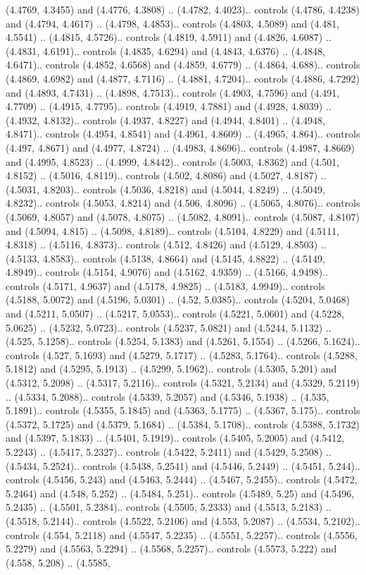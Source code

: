 (4.4769, 4.3455) and (4.4776, 4.3808) .. (4.4782, 4.4023).. controls (4.4786, 4.4238) and (4.4794, 4.4617) .. (4.4798, 4.4853).. controls (4.4803, 4.5089) and (4.481, 4.5541) .. (4.4815, 4.5726).. controls (4.4819, 4.5911) and (4.4826, 4.6087) .. (4.4831, 4.6191).. controls (4.4835, 4.6294) and (4.4843, 4.6376) .. (4.4848, 4.6471).. controls (4.4852, 4.6568) and (4.4859, 4.6779) .. (4.4864, 4.688).. controls (4.4869, 4.6982) and (4.4877, 4.7116) .. (4.4881, 4.7204).. controls (4.4886, 4.7292) and (4.4893, 4.7431) .. (4.4898, 4.7513).. controls (4.4903, 4.7596) and (4.491, 4.7709) .. (4.4915, 4.7795).. controls (4.4919, 4.7881) and (4.4928, 4.8039) .. (4.4932, 4.8132).. controls (4.4937, 4.8227) and (4.4944, 4.8401) .. (4.4948, 4.8471).. controls (4.4954, 4.8541) and (4.4961, 4.8609) .. (4.4965, 4.864).. controls (4.497, 4.8671) and (4.4977, 4.8724) .. (4.4983, 4.8696).. controls (4.4987, 4.8669) and (4.4995, 4.8523) .. (4.4999, 4.8442).. controls (4.5003, 4.8362) and (4.501, 4.8152) .. (4.5016, 4.8119).. controls (4.502, 4.8086) and (4.5027, 4.8187) .. (4.5031, 4.8203).. controls (4.5036, 4.8218) and (4.5044, 4.8249) .. (4.5049, 4.8232).. controls (4.5053, 4.8214) and (4.506, 4.8096) .. (4.5065, 4.8076).. controls (4.5069, 4.8057) and (4.5078, 4.8075) .. (4.5082, 4.8091).. controls (4.5087, 4.8107) and (4.5094, 4.815) .. (4.5098, 4.8189).. controls (4.5104, 4.8229) and (4.5111, 4.8318) .. (4.5116, 4.8373).. controls (4.512, 4.8426) and (4.5129, 4.8503) .. (4.5133, 4.8583).. controls (4.5138, 4.8664) and (4.5145, 4.8822) .. (4.5149, 4.8949).. controls (4.5154, 4.9076) and (4.5162, 4.9359) .. (4.5166, 4.9498).. controls (4.5171, 4.9637) and (4.5178, 4.9825) .. (4.5183, 4.9949).. controls (4.5188, 5.0072) and (4.5196, 5.0301) .. (4.52, 5.0385).. controls (4.5204, 5.0468) and (4.5211, 5.0507) .. (4.5217, 5.0553).. controls (4.5221, 5.0601) and (4.5228, 5.0625) .. (4.5232, 5.0723).. controls (4.5237, 5.0821) and (4.5244, 5.1132) .. (4.525, 5.1258).. controls (4.5254, 5.1383) and (4.5261, 5.1554) .. (4.5266, 5.1624).. controls (4.527, 5.1693) and (4.5279, 5.1717) .. (4.5283, 5.1764).. controls (4.5288, 5.1812) and (4.5295, 5.1913) .. (4.5299, 5.1962).. controls (4.5305, 5.201) and (4.5312, 5.2098) .. (4.5317, 5.2116).. controls (4.5321, 5.2134) and (4.5329, 5.2119) .. (4.5334, 5.2088).. controls (4.5339, 5.2057) and (4.5346, 5.1938) .. (4.535, 5.1891).. controls (4.5355, 5.1845) and (4.5363, 5.1775) .. (4.5367, 5.175).. controls (4.5372, 5.1725) and (4.5379, 5.1684) .. (4.5384, 5.1708).. controls (4.5388, 5.1732) and (4.5397, 5.1833) .. (4.5401, 5.1919).. controls (4.5405, 5.2005) and (4.5412, 5.2243) .. (4.5417, 5.2327).. controls (4.5422, 5.2411) and (4.5429, 5.2508) .. (4.5434, 5.2524).. controls (4.5438, 5.2541) and (4.5446, 5.2449) .. (4.5451, 5.244).. controls (4.5456, 5.243) and (4.5463, 5.2444) .. (4.5467, 5.2455).. controls (4.5472, 5.2464) and (4.548, 5.252) .. (4.5484, 5.251).. controls (4.5489, 5.25) and (4.5496, 5.2435) .. (4.5501, 5.2384).. controls (4.5505, 5.2333) and (4.5513, 5.2183) .. (4.5518, 5.2144).. controls (4.5522, 5.2106) and (4.553, 5.2087) .. (4.5534, 5.2102).. controls (4.554, 5.2118) and (4.5547, 5.2235) .. (4.5551, 5.2257).. controls (4.5556, 5.2279) and (4.5563, 5.2294) .. (4.5568, 5.2257).. controls (4.5573, 5.222) and (4.558, 5.208) .. (4.5585, 